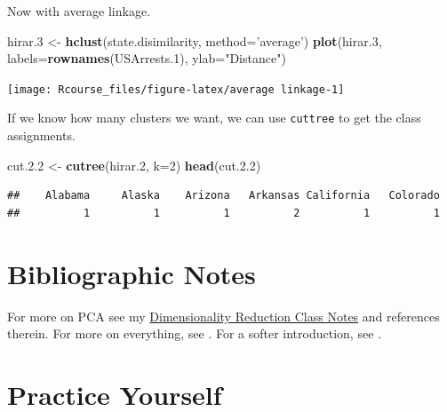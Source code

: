 \documentclass[]{book}
\newenvironment{Shaded}{\begin{snugshade}}{\end{snugshade}}
\newcommand{\KeywordTok}[1]{\textcolor[rgb]{0.13,0.29,0.53}{\textbf{#1}}}
\newcommand{\DataTypeTok}[1]{\textcolor[rgb]{0.13,0.29,0.53}{#1}}
\newcommand{\DecValTok}[1]{\textcolor[rgb]{0.00,0.00,0.81}{#1}}
\newcommand{\FloatTok}[1]{\textcolor[rgb]{0.00,0.00,0.81}{#1}}
\newcommand{\StringTok}[1]{\textcolor[rgb]{0.31,0.60,0.02}{#1}}
\newcommand{\NormalTok}[1]{#1}
\theoremstyle{definition}
\theoremstyle{definition}
\theoremstyle{definition}
\theoremstyle{remark}
\begin{document}
Now with average linkage.

\begin{Shaded}
\begin{Highlighting}[]
\NormalTok{hirar.}\DecValTok{3}\NormalTok{ <-}\StringTok{ }\KeywordTok{hclust}\NormalTok{(state.disimilarity, }\DataTypeTok{method=}\StringTok{'average'}\NormalTok{)}
\KeywordTok{plot}\NormalTok{(hirar.}\DecValTok{3}\NormalTok{, }\DataTypeTok{labels=}\KeywordTok{rownames}\NormalTok{(USArrests.}\DecValTok{1}\NormalTok{), }\DataTypeTok{ylab=}\StringTok{"Distance"}\NormalTok{)}
\end{Highlighting}
\end{Shaded}

\texttt{[image: Rcourse\_files/figure-latex/average linkage-1]}

If we know how many clusters we want, we can use \texttt{cuttree} to get
the class assignments.

\begin{Shaded}
\begin{Highlighting}[]
\NormalTok{cut.}\FloatTok{2.2}\NormalTok{ <-}\StringTok{ }\KeywordTok{cutree}\NormalTok{(hirar.}\DecValTok{2}\NormalTok{, }\DataTypeTok{k=}\DecValTok{2}\NormalTok{)}
\KeywordTok{head}\NormalTok{(cut.}\FloatTok{2.2}\NormalTok{)}
\end{Highlighting}
\end{Shaded}

\begin{verbatim}
##    Alabama     Alaska    Arizona   Arkansas California   Colorado 
##          1          1          1          2          1          1
\end{verbatim}

\section{Bibliographic Notes}\label{bibliographic-notes-7}

For more on PCA see my
\href{https://github.com/johnros/dim_reduce/blob/master/dim_reduce.pdf}{Dimensionality
Reduction Class Notes} and references therein. For more on everything,
see \citet{friedman2001elements}. For a softer introduction, see
\citet{james2013introduction}.

\section{Practice Yourself}\label{practice-yourself-7}
\end{document}
